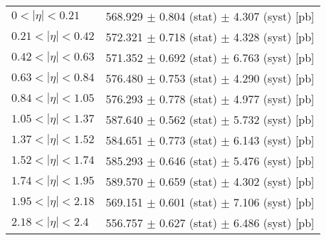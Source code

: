 \begin{tabular}{lc}
\hline
$0 < |\eta| <0.21$             & 568.929 $\pm$ 0.804 (stat) $\pm$ 4.307 (syst) [pb]  \\
$0.21 < |\eta| <0.42$          & 572.321 $\pm$ 0.718 (stat) $\pm$ 4.328 (syst) [pb]  \\
$0.42 < |\eta| <0.63$          & 571.352 $\pm$ 0.692 (stat) $\pm$ 6.763 (syst) [pb]  \\
$0.63 < |\eta| <0.84$          & 576.480 $\pm$ 0.753 (stat) $\pm$ 4.290 (syst) [pb]  \\
$0.84 < |\eta| <1.05$          & 576.293 $\pm$ 0.778 (stat) $\pm$ 4.977 (syst) [pb]  \\
$1.05 < |\eta| <1.37$          & 587.640 $\pm$ 0.562 (stat) $\pm$ 5.732 (syst) [pb]  \\
$1.37 < |\eta| <1.52$          & 584.651 $\pm$ 0.773 (stat) $\pm$ 6.143 (syst) [pb]  \\
$1.52 < |\eta| <1.74$          & 585.293 $\pm$ 0.646 (stat) $\pm$ 5.476 (syst) [pb]  \\
$1.74 < |\eta| <1.95$          & 589.570 $\pm$ 0.659 (stat) $\pm$ 4.302 (syst) [pb]  \\
$1.95 < |\eta| <2.18$          & 569.151 $\pm$ 0.601 (stat) $\pm$ 7.106 (syst) [pb]  \\
$2.18 < |\eta| <2.4$           & 556.757 $\pm$ 0.627 (stat) $\pm$ 6.486 (syst) [pb]  \\
\hline
\end{tabular}
